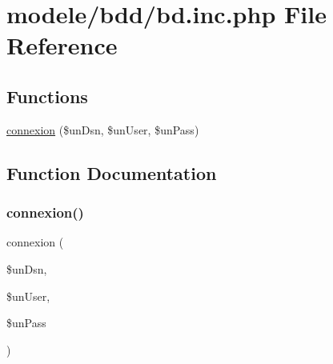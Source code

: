 \hypertarget{bd_8inc_8php}{}\section{modele/bdd/bd.inc.\+php File Reference}
\label{bd_8inc_8php}
\subsection*{Functions}
\begin{DoxyCompactItemize}
\item 
\hyperlink{bd_8inc_8php_a70c63c2975d174bd6e4cfa96a1828161}{connexion} (\$un\+Dsn, \$un\+User, \$un\+Pass)
\end{DoxyCompactItemize}


\subsection{Function Documentation}
\mbox{\label{bd_8inc_8php_a70c63c2975d174bd6e4cfa96a1828161}} 
\subsubsection{\texorpdfstring{connexion()}{connexion()}}
{\footnotesize\ttfamily connexion (\begin{DoxyParamCaption}\item[{}]{\$un\+Dsn,  }\item[{}]{\$un\+User,  }\item[{}]{\$un\+Pass }\end{DoxyParamCaption})}

